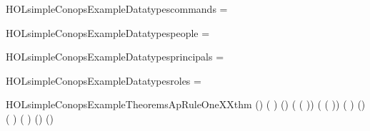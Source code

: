 \newcommand{\HOLsimpleConopsExampleDate}{05 March 2017}
\newcommand{\HOLsimpleConopsExampleTime}{16:25}
\begin{SaveVerbatim}{HOLsimpleConopsExampleDatatypescommands}
 =  \HOLTokenBar{}  \HOLTokenBar{} 
\end{SaveVerbatim}
\newcommand{\HOLsimpleConopsExampleDatatypescommands}{\UseVerbatim{HOLsimpleConopsExampleDatatypescommands}}
\begin{SaveVerbatim}{HOLsimpleConopsExampleDatatypespeople}
 =  \HOLTokenBar{} 
\end{SaveVerbatim}
\newcommand{\HOLsimpleConopsExampleDatatypespeople}{\UseVerbatim{HOLsimpleConopsExampleDatatypespeople}}
\begin{SaveVerbatim}{HOLsimpleConopsExampleDatatypesprincipals}
 =   \HOLTokenBar{}   \HOLTokenBar{}  
\end{SaveVerbatim}
\newcommand{\HOLsimpleConopsExampleDatatypesprincipals}{\UseVerbatim{HOLsimpleConopsExampleDatatypesprincipals}}
\begin{SaveVerbatim}{HOLsimpleConopsExampleDatatypesroles}
 =  \HOLTokenBar{} 
\end{SaveVerbatim}
\newcommand{\HOLsimpleConopsExampleDatatypesroles}{\UseVerbatim{HOLsimpleConopsExampleDatatypesroles}}
\newcommand{\HOLsimpleConopsExampleDatatypes}{
\HOLsimpleConopsExampleDatatypescommands\HOLsimpleConopsExampleDatatypespeople\HOLsimpleConopsExampleDatatypesprincipals\HOLsimpleConopsExampleDatatypesroles}
\begin{SaveVerbatim}{HOLsimpleConopsExampleTheoremsApRuleOneXXthm}
\HOLTokenTurnstile{} (\HOLSymConst{,}\HOLSymConst{,})   ( )    \HOLSymConst{\HOLTokenImp{}}
   (\HOLSymConst{,}\HOLSymConst{,}) 
    ( ( )) ( ( ))
     ( ) \HOLSymConst{\HOLTokenImp{}}
   (\HOLSymConst{,}\HOLSymConst{,}) 
    ( )   ( ) 
     \HOLSymConst{\HOLTokenImp{}}
   (\HOLSymConst{,}\HOLSymConst{,})       \HOLSymConst{\HOLTokenImp{}}
   (\HOLSymConst{,}\HOLSymConst{,})   
\end{SaveVerbatim}
